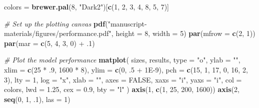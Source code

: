 \documentclass[11pt,]{article}
\newenvironment{Shaded}{\begin{snugshade}}{\end{snugshade}}
\newcommand{\KeywordTok}[1]{\textcolor[rgb]{0.13,0.29,0.53}{\textbf{{#1}}}}
\newcommand{\DataTypeTok}[1]{\textcolor[rgb]{0.13,0.29,0.53}{{#1}}}
\newcommand{\DecValTok}[1]{\textcolor[rgb]{0.00,0.00,0.81}{{#1}}}
\newcommand{\FloatTok}[1]{\textcolor[rgb]{0.00,0.00,0.81}{{#1}}}
\newcommand{\StringTok}[1]{\textcolor[rgb]{0.31,0.60,0.02}{{#1}}}
\newcommand{\CommentTok}[1]{\textcolor[rgb]{0.56,0.35,0.01}{\textit{{#1}}}}
\newcommand{\OtherTok}[1]{\textcolor[rgb]{0.56,0.35,0.01}{{#1}}}
\newcommand{\NormalTok}[1]{{#1}}
\begin{document}
\begin{Shaded}
\begin{Highlighting}[]
\NormalTok{colors =}\StringTok{ }\KeywordTok{brewer.pal}\NormalTok{(}\DecValTok{8}\NormalTok{, }\StringTok{"Dark2"}\NormalTok{)[}\KeywordTok{c}\NormalTok{(}\DecValTok{1}\NormalTok{, }\DecValTok{2}\NormalTok{, }\DecValTok{3}\NormalTok{, }\DecValTok{4}\NormalTok{, }\DecValTok{8}\NormalTok{, }\DecValTok{5}\NormalTok{, }\DecValTok{7}\NormalTok{)]}

\CommentTok{# Set up the plotting canvas}
\KeywordTok{pdf}\NormalTok{(}\StringTok{"manuscript-materials/figures/performance.pdf"}\NormalTok{, }\DataTypeTok{height =} \DecValTok{8}\NormalTok{, }\DataTypeTok{width =} \DecValTok{5}\NormalTok{)}
\KeywordTok{par}\NormalTok{(}\DataTypeTok{mfrow =} \KeywordTok{c}\NormalTok{(}\DecValTok{2}\NormalTok{, }\DecValTok{1}\NormalTok{))}
\KeywordTok{par}\NormalTok{(}\DataTypeTok{mar =} \KeywordTok{c}\NormalTok{(}\DecValTok{5}\NormalTok{, }\DecValTok{4}\NormalTok{, }\DecValTok{3}\NormalTok{, }\DecValTok{0}\NormalTok{) +}\StringTok{ }\NormalTok{.}\DecValTok{1}\NormalTok{)}

\CommentTok{# Plot the model performance}
\KeywordTok{matplot}\NormalTok{(}
  \NormalTok{sizes, }
  \NormalTok{results, }
  \DataTypeTok{type =} \StringTok{"o"}\NormalTok{, }
  \DataTypeTok{ylab =} \StringTok{""}\NormalTok{, }
  \DataTypeTok{xlim =} \KeywordTok{c}\NormalTok{(}\DecValTok{25} \NormalTok{*}\StringTok{ }\NormalTok{.}\DecValTok{9}\NormalTok{, }\DecValTok{1600} \NormalTok{*}\StringTok{ }\DecValTok{8}\NormalTok{),}
  \DataTypeTok{ylim =} \KeywordTok{c}\NormalTok{(}\DecValTok{0}\NormalTok{, .}\DecValTok{5} \NormalTok{+}\StringTok{ }\FloatTok{1E-9}\NormalTok{),}
  \DataTypeTok{pch =} \KeywordTok{c}\NormalTok{(}\DecValTok{15}\NormalTok{, }\DecValTok{1}\NormalTok{, }\DecValTok{17}\NormalTok{, }\DecValTok{0}\NormalTok{, }\DecValTok{16}\NormalTok{, }\DecValTok{2}\NormalTok{, }\DecValTok{3}\NormalTok{), }
  \DataTypeTok{lty =} \DecValTok{1}\NormalTok{,}
  \DataTypeTok{log =} \StringTok{"x"}\NormalTok{,}
  \DataTypeTok{xlab =} \StringTok{""}\NormalTok{,}
  \DataTypeTok{axes =} \OtherTok{FALSE}\NormalTok{,}
  \DataTypeTok{xaxs =} \StringTok{"i"}\NormalTok{,}
  \DataTypeTok{yaxs =} \StringTok{"i"}\NormalTok{,}
  \DataTypeTok{col =} \NormalTok{colors,}
  \DataTypeTok{lwd =} \FloatTok{1.25}\NormalTok{,}
  \DataTypeTok{cex =} \FloatTok{0.9}\NormalTok{,}
  \DataTypeTok{bty =} \StringTok{"l"}
\NormalTok{)}
\KeywordTok{axis}\NormalTok{(}\DecValTok{1}\NormalTok{, }\KeywordTok{c}\NormalTok{(}\DecValTok{1}\NormalTok{, }\DecValTok{25}\NormalTok{, }\DecValTok{200}\NormalTok{, }\DecValTok{1600}\NormalTok{))}
\KeywordTok{axis}\NormalTok{(}\DecValTok{2}\NormalTok{, }\KeywordTok{seq}\NormalTok{(}\DecValTok{0}\NormalTok{, }\DecValTok{1}\NormalTok{, .}\DecValTok{1}\NormalTok{), }\DataTypeTok{las =} \DecValTok{1}\NormalTok{)}


\end{Highlighting}
\end{Shaded}
\end{document}
